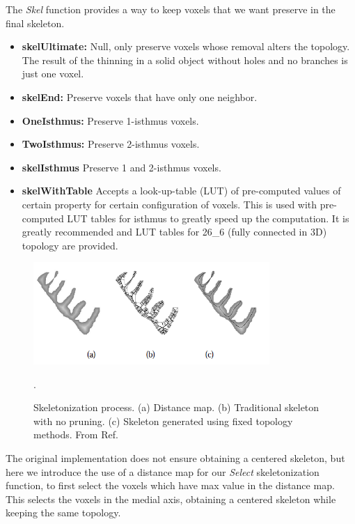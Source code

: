 The \textit{Skel} function provides a way to keep voxels that we want preserve in the final skeleton.

\begin{itemize}[topsep=0pt]
  \item \textbf{skelUltimate: } Null, only preserve voxels whose removal alters the topology.
   The result of the thinning in a solid object without holes and no branches is just one voxel.
  \item \textbf{skelEnd: } Preserve voxels that have only one neighbor.
  \item \textbf{OneIsthmus: } Preserve 1-isthmus voxels.
  \item \textbf{TwoIsthmus: } Preserve 2-isthmus voxels.
  \item \textbf{skelIsthmus } Preserve 1 and 2-isthmus voxels.
  \item \textbf{skelWithTable } Accepts a look-up-table (LUT) of pre-computed values of certain property for certain configuration of voxels. This is used with pre-computed LUT tables for isthmus to greatly speed up the computation. It is greatly recommended and LUT tables for 26\_6 (fully connected in 3D) topology are provided.
\end{itemize}

\begin{figure}[!htb]
\begin{center}
\includegraphics[width=0.8\textwidth]{Figures/chapter-image/skeleton-fixedtopo_letters.png}%
\caption[Skeletonization]{Skeletonization process. (a) Distance
map. (b) Traditional skeleton with no pruning. (c) Skeleton generated using
fixed topology methods. From Ref.\citep{bai_skeleton_2007,golland_fixed_2000}}.
\label{fig:skeleton-fixedtopo}
\end{center}
\end{figure}

The original implementation \cite{couprie_asymmetric_2016} does not ensure obtaining a centered skeleton, but here we introduce the use of a distance map for our \textit{Select} skeletonization function, to first select the voxels which have max value in the distance map. This selects the voxels in the medial axis, obtaining a centered skeleton while keeping the same topology.

